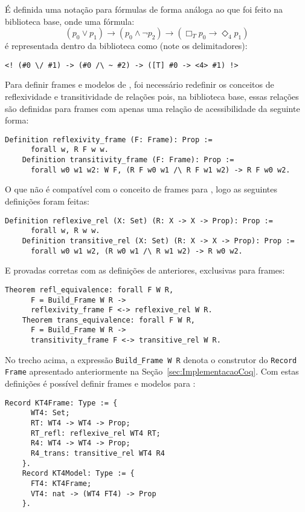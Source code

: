       É definida uma notação para fórmulas de forma análoga ao que foi feito na biblioteca base, onde uma fórmula:
      \[
        (p_0 \lor p_1) \to (p_0 \land \neg p_2) \to (\Box_{T} p_0 \to \Diamond_{4} p_1)
      \]
      é representada dentro da biblioteca como (note os delimitadores):
      \begin{lstlisting}[basicstyle=\ttfamily,columns=fullflexible]
    <! (#0 \/ #1) -> (#0 /\ ~ #2) -> ([T] #0 -> <4> #1) !>
      \end{lstlisting}

      Para definir frames e modelos de \SisT, foi necessário redefinir os conceitos de reflexividade e transitividade de relações pois, na biblioteca base,
      essas relações são definidas para frames com apenas uma relação de acessibilidade da seguinte forma:
      \begin{lstlisting}[language=coq]
    Definition reflexivity_frame (F: Frame): Prop :=
      forall w, R F w w.
    Definition transitivity_frame (F: Frame): Prop :=
      forall w0 w1 w2: W F, (R F w0 w1 /\ R F w1 w2) -> R F w0 w2.
      \end{lstlisting}
      O que não é compatível com o conceito de frames para \SisT, logo as seguintes definições foram feitas:

      \begin{lstlisting}[language=coq]
    Definition reflexive_rel (X: Set) (R: X -> X -> Prop): Prop :=
      forall w, R w w.
    Definition transitive_rel (X: Set) (R: X -> X -> Prop): Prop :=
      forall w0 w1 w2, (R w0 w1 /\ R w1 w2) -> R w0 w2.
      \end{lstlisting}
      E provadas corretas com as definições de anteriores, exclusivas para frames:

      \begin{lstlisting}[language=coq]
    Theorem refl_equivalence: forall F W R,
      F = Build_Frame W R ->
      reflexivity_frame F <-> reflexive_rel W R.
    Theorem trans_equivalence: forall F W R,
      F = Build_Frame W R ->
      transitivity_frame F <-> transitive_rel W R.
      \end{lstlisting}

      No trecho acima, a expressão \texttt{Build\_Frame W R} denota o construtor do \texttt{Record Frame} apresentado anteriormente na Seção~\ref{sec:ImplementacaoCoq}.
      Com estas definições é possível definir frames e modelos para \SisT:
      \begin{lstlisting}[language=coq]
    Record KT4Frame: Type := {
      WT4: Set;
      RT: WT4 -> WT4 -> Prop;
      RT_refl: reflexive_rel WT4 RT;
      R4: WT4 -> WT4 -> Prop;
      R4_trans: transitive_rel WT4 R4
    }.
    Record KT4Model: Type := {
      FT4: KT4Frame;
      VT4: nat -> (WT4 FT4) -> Prop
    }.
      \end{lstlisting}

